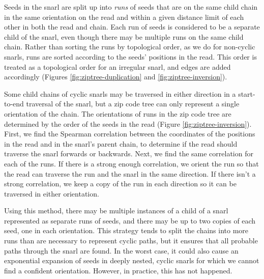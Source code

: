 \documentclass[11pt]{ucscthesis}
\begin{document}
Seeds in the snarl are split up into \emph{runs} of seeds that are on the same child chain in the same orientation on the read and within a given distance limit of each other in both the read and chain.
Each run of seeds is considered to be a separate child of the snarl, even though there may be multiple runs on the same child chain.
Rather than sorting the runs by topological order, as we do for non-cyclic snarls, runs are sorted according to the seeds' positions in the read.
This order is treated as a topological order for an irregular snarl, and edges are added accordingly (Figures \ref{fig:ziptree-duplication} and \ref{fig:ziptree-inversion}).

Some child chains of cyclic snarls may be traversed in either direction in a start-to-end traversal of the snarl, but a zip code tree can only represent a single orientation of the chain.
The orientations of runs in the zip code tree are determined by the order of the seeds in the read (Figure \ref{fig:ziptree-inversion}).
First, we find the Spearman correlation between the coordinates of the positions in the read and in the snarl's parent chain, to determine if the read should traverse the snarl forwards or backwards.
Next, we find the same correlation for each of the runs.
If there is a strong enough correlation, we orient the run so that the read can traverse the run and the snarl in the same direction.
If there isn't a strong correlation, we keep a copy of the run in each direction so it can be traversed in either orientation.

Using this method, there may be multiple instances of a child of a snarl represented as separate runs of seeds, and there may be up to two copies of each seed, one in each orientation.
This strategy tends to split the chains into more runs than are necessary to represent cyclic paths, but it ensures that all probable paths through the snarl are found.
In the worst case, it could also cause an exponential expansion of seeds in deeply nested, cyclic snarls for which we cannot find a confident orientation.
However, in practice, this has not happened.
\end{document}
